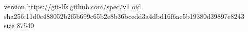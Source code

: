 version https://git-lfs.github.com/spec/v1
oid sha256:11d0c488052b2f5b699c65b2e8b36bcedd3a4dbd16f6ae5b19380d39897e8243
size 87540
